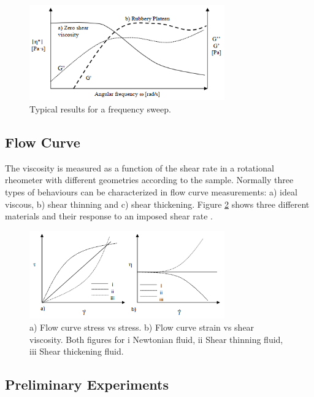 \begin{figure}[th]
\centering
\includegraphics[width=0.75\textwidth]{./Figures/freqSweep.png}
\decoRule
\caption[Frequency Sweep]{Typical results for a frequency sweep. \cite{Flores2017}}
\label{fig:freqSweep}
\end{figure}

\subsection{Flow Curve}
The viscosity is measured as a function of the shear rate in a rotational rheometer with different geometries according to the sample. Normally three types of behaviours can be characterized in flow curve measurements: a) ideal viscous, b) shear thinning and c) shear thickening. Figure \ref{fig:flowCurve} shows three different materials and their response to an imposed shear rate \cite{Flores2017}.

\begin{figure}[th]
\centering
\includegraphics[width=0.75\textwidth]{./Figures/flowCurve.png}
\decoRule
\caption[Flow Curves]{a) Flow curve stress vs stress. b) Flow curve strain vs shear viscosity. Both figures for i Newtonian fluid, ii Shear thinning fluid, iii Shear thickening fluid. \cite{Flores2017}}
\label{fig:flowCurve}
\end{figure}

\subsection{Preliminary Experiments}







